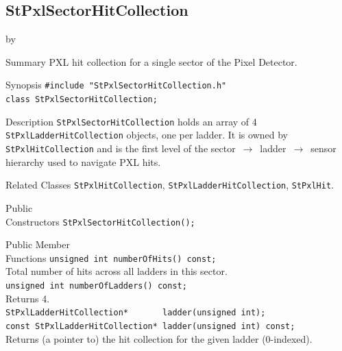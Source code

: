 \documentclass[twoside]{article}
\newcommand{\entrylabel}[1]{\mbox{\textbf{{#1}}}\hfil}%
\newenvironment{entry}
{\begin{list}{}%
    {\renewcommand{\makelabel}{\entrylabel}%
     \setlength{\labelwidth}{90pt}%
     \setlength{\leftmargin}{\labelwidth}
     \advance\leftmargin by \labelsep%
      }%
    }%
  {\end{list}}
\newcommand{\Entrylabel}[1]%
{\raisebox{0pt}[1ex][0pt]{\makebox[\labelwidth][l]%
    {\parbox[t]{\labelwidth}{\hspace{0pt}\textbf{{#1}}}}}}
\newenvironment{Entry}%
{\renewcommand{\entrylabel}{\Entrylabel}\begin{entry}}%
  {\end{entry}}
\begin{document}
\subsection{StPxlSectorHitCollection}
\label{sec:StPxlSectorHitCollection}
\begin{Entry}
\item[Summary] PXL hit collection for a single sector of the Pixel Detector.
\item[Synopsis]
    \verb+#include "StPxlSectorHitCollection.h"+\\
    \verb+class StPxlSectorHitCollection;+\\
\item[Description]
    \texttt{StPxlSectorHitCollection} holds an array of 4
    \texttt{StPxlLadderHitCollection} objects, one per ladder.  It is owned
    by \texttt{StPxlHitCollection} and is the first level of the
    sector~$\to$~ladder~$\to$~sensor hierarchy used to navigate PXL hits.
\item[Related Classes]
    \texttt{StPxlHitCollection}, \texttt{StPxlLadderHitCollection},
    \texttt{StPxlHit}.
\item[Public\\ Constructors]
    \verb+StPxlSectorHitCollection();+\\
\item[Public Member\\ Functions]
    \verb+unsigned int numberOfHits() const;+\\
    Total number of hits across all ladders in this sector.\\
    \verb+unsigned int numberOfLadders() const;+\\
    Returns 4.\\
    \verb+StPxlLadderHitCollection*       ladder(unsigned int);+\\
    \verb+const StPxlLadderHitCollection* ladder(unsigned int) const;+\\
    Returns (a pointer to) the hit collection for the given ladder (0-indexed).\\
\end{Entry}
\clearpage

\end{document}
